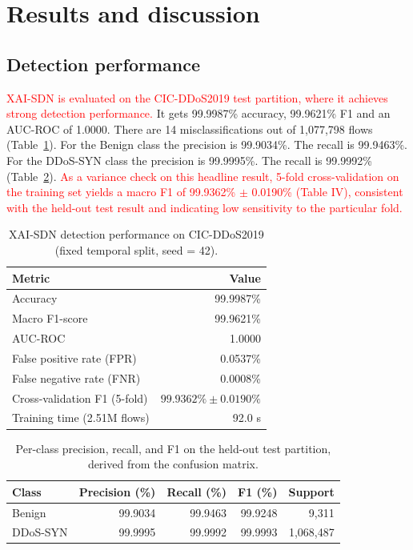 \documentclass{ieeeaccess}
\begin{document}
\section{Results and discussion}
\label{sec:results}

\subsection{Detection performance}
\textcolor{red}{XAI-SDN is evaluated on the CIC-DDoS2019 test partition, where it achieves strong detection performance.} It gets 99.9987\% accuracy, 99.9621\% F1 and an AUC-ROC of 1.0000. There are 14 misclassifications out of 1,077,798 flows (Table~\ref{tab:results}). For the Benign class the precision is 99.9034\%. The recall is 99.9463\%. For the DDoS-SYN class the precision is 99.9995\%. The recall is 99.9992\% (Table~\ref{tab:perclass}). \textcolor{red}{As a variance check on this headline result, 5-fold cross-validation on the training set yields a macro F1 of 99.9362\% $\pm$ 0.0190\% (Table IV), consistent with the held-out test result and indicating low sensitivity to the particular fold.}

\begin{table}
\caption{XAI-SDN detection performance on CIC-DDoS2019 (fixed temporal split, seed = 42).}
\centering
\label{tab:results}
\small
\setlength{\tabcolsep}{6pt}
\renewcommand{\arraystretch}{1.25}
\begin{tabular}{@{}lr@{}}
\toprule
\textbf{Metric} & \textbf{Value} \\
\midrule
Accuracy & 99.9987\% \\
Macro F1-score & 99.9621\% \\
AUC-ROC & 1.0000 \\
False positive rate (FPR) & 0.0537\% \\
False negative rate (FNR) & 0.0008\% \\
Cross-validation F1 (5-fold) & $99.9362\% \pm 0.0190\%$ \\
Training time (2.51M flows) & 92.0 s \\
\bottomrule
\end{tabular}
\end{table}

\begin{table}
\caption{Per-class precision, recall, and F1 on the held-out test partition, derived from the confusion matrix.}
\centering
\label{tab:perclass}
\small
\setlength{\tabcolsep}{4pt}
\begin{tabular}{@{}lrrrr@{}}
\toprule
\textbf{Class} & \textbf{Precision (\%)} & \textbf{Recall (\%)} & \textbf{F1 (\%)} & \textbf{Support} \\
\midrule
Benign & 99.9034 & 99.9463 & 99.9248 & 9,311 \\
DDoS-SYN & 99.9995 & 99.9992 & 99.9993 & 1,068,487 \\
\bottomrule
\end{tabular}
\end{table}
\end{document}
